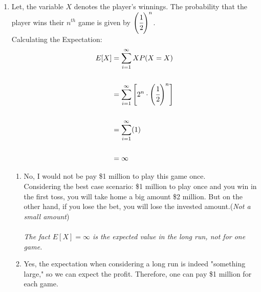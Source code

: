 \documentclass{article}
\begin{document}
\begin{enumerate}
\newpage
\item 
    Let, the variable \( X \) denotes the player's winnings. The probability that the player wins their \( n^{th} \) game is given by \( \left(\cfrac{1}{2}\right)^n \).\\
    Calculating the Expectation:
        \begin{align*}
        E [X] &= \sum_{i=1}^{\infty} X P(X = X) \\\\
            &= \sum_{i=1}^{\infty} \left[2^n\cdot \left(\cfrac{1}{2}\right)^n\right] \\\\
            &= \sum_{i=1}^{\infty} (1) \\\\
            &= \infty
        \end{align*}
        \begin{enumerate}
            \item 
            No, I would not be pay \$1 million to play this game once.\\
            Considering the best case scenario: \$1 million to play once and you win in the first toss, you will take home a big amount \$2 million. But on the other hand, if you lose the bet, you will lose the invested amount.(\textit{Not a small amount})\\\\
            \textit{The fact \( E[X] = \infty \) is the expected value in the long run, not for one game.}\\
            \item 
            Yes, the expectation when considering a long run is indeed "something large," so we can expect the profit. Therefore, one can pay \$1 million for each game.
        \end{enumerate}


\end{enumerate}
\end{document}
